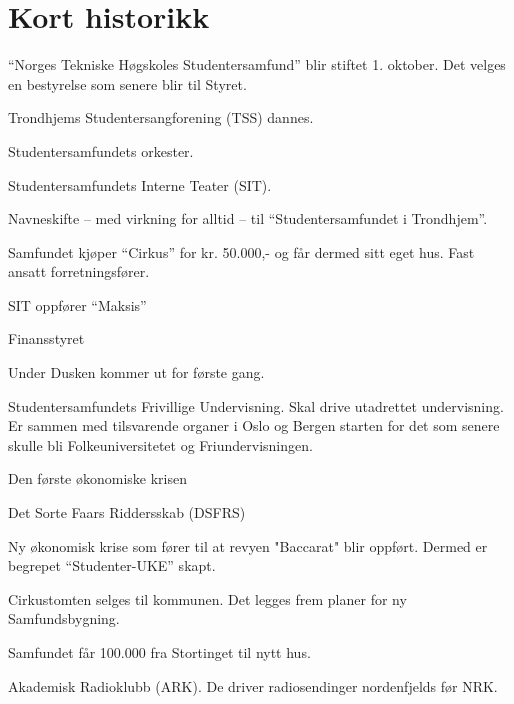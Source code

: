 \documentclass[fsbok.tex]{subfiles}
\begin{document}
\chapter*{Kort historikk}

	\item ``Norges Tekniske Høgskoles Studentersamfund'' blir stiftet 1. oktober. Det velges en bestyrelse som senere blir
	til Styret.
	\item Trondhjems Studentersangforening (TSS) dannes.
    \item Studentersamfundets orkester.
    \item Studentersamfundets Interne Teater (SIT).
\yearend

	\item Navneskifte -- med virkning for alltid -- til ``Studentersamfundet i Trondhjem''.
  \item Samfundet kjøper ``Cirkus'' for kr. 50.000,- og får dermed sitt eget hus. Fast ansatt forretningsfører.
\yearend 

  \item SIT oppfører ``Maksis''
  \item Finansstyret
\yearend 

  \item Under Dusken kommer ut for første gang.
  \item Studentersamfundets Frivillige Undervisning. Skal drive utadrettet undervisning. Er sammen med tilsvarende
organer i Oslo og Bergen starten for det som senere skulle bli Folkeuniversitetet og Friundervisningen.
\yearend 

  \item Den første økonomiske krisen
\yearend 

  \item Det Sorte Faars Riddersskab (DSFRS)
\yearend 

  \item Ny økonomisk krise som fører til at revyen "Baccarat" blir oppført. Dermed er begrepet ``Studenter-UKE'' skapt.
\yearend 

  \item Cirkustomten selges til kommunen. Det legges frem planer for ny Samfundsbygning.
\yearend 

  \item Samfundet får 100.000 fra Stortinget til nytt hus.
\yearend 

  \item Akademisk Radioklubb (ARK). De driver radiosendinger nordenfjelds før NRK.
\yearend 
\end{document}
